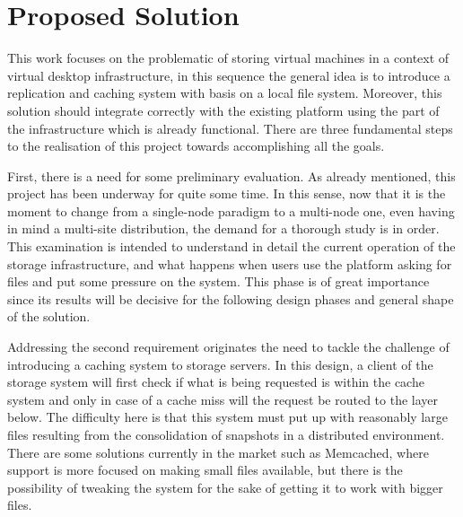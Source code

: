 
\section{Proposed Solution} %
\label{sec:proposed_solution}

This work focuses on the problematic of storing virtual machines in a context of virtual desktop infrastructure, in this sequence the general idea is to introduce a replication and caching system with basis on a local file system. Moreover, this solution should integrate correctly with the existing platform using the part of the infrastructure which is already functional.
There are three fundamental steps to the realisation of this project towards accomplishing all the goals.\footnotemark


First, there is a need for some preliminary evaluation. 
As already mentioned, this project has been underway for quite some time. In this sense, now that it is the moment to change from a single-node paradigm to a multi-node one, even having in mind a multi-site distribution, the demand for a thorough study is in order. This examination is intended to understand in detail the current operation of the storage infrastructure, and what happens when users use the platform asking for files and put some pressure on the system. This phase is of great importance since its results will be decisive for the following design phases and general shape of the solution.


Addressing the second requirement originates the need to tackle the challenge of introducing a caching system to storage servers. In this design, a client of the storage system will first check if what is being requested is within the cache system and only in case of a cache miss will the request be routed to the layer below. The difficulty here is that this system must put up with reasonably large files resulting from the consolidation of snapshots in a distributed environment.
There are some solutions currently in the market such as Memcached, where support is more focused on making small files available, but there is the possibility of tweaking the system for the sake of getting it to work with bigger files.

